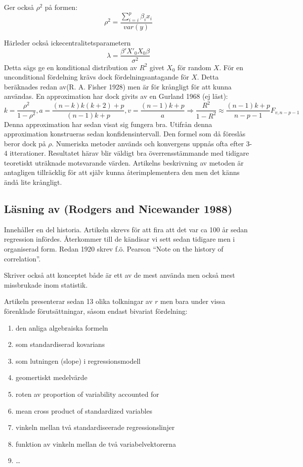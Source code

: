 \documentclass[]{article}
\providecommand{\tightlist}{%
  \setlength{\itemsep}{0pt}\setlength{\parskip}{0pt}}
\begin{document}
Ger också \(\rho^2\) på formen:
\[\rho^2 = \frac{\sum_{i = i}^p \beta_ix_i}{var(y)}\]

Härleder också ickecentralitetsparametern
\[\lambda = \frac{\beta'X'_0X_0\beta}{\sigma^2}\] Detta sägs ge en
konditional distribution av \(R^2\) givet \(X_0\) för random \(X\). För
en unconditional fördelning krävs dock fördelningsantagande för \(X\).
Detta beräknades redan av(R. A. Fisher 1928) men är för krångligt för
att kunna användas. En approximation har dock givits av en Gurland 1968
(ej läst):
\[k = \frac{\rho^2}{1-\rho^2}, a = \frac{(n-k)k(k+2) + p}{(n-1)k +p}, v = \frac{(n-1)k+p}{a}\Rightarrow \frac{R^2}{1-R^2} \approx \frac{(n-1)k +p}{n-p-1}F_{v, n-p-1}\]
Denna approximation har sedan visat sig fungera bra. Utifrån denna
approximation konstrueras sedan konfidensintervall. Den formel som då
föreslås beror dock på \(\rho\). Numeriska metoder används och
konvergens uppnås ofta efter 3-4 itterationer. Resultatet härav blir
väldigt bra överrensstämmande med tidigare teoretiskt uträknade
motsvarande värden. Artikelns beskrivning av metoden är antagligen
tillräcklig för att själv kunna återimplementera den men det känns ändå
lite krångligt.

\subsection{Läsning av (Rodgers and Nicewander
1988)}\label{lasning-av-rodgers1988}

Innehåller en del historia. Artikeln skrevs för att fira att det var ca
100 år sedan regression infördes. Återkommer till de kändisar vi sett
sedan tidigare men i organiserad form. Redan 1920 skrev f.ö. Pearson
``Note on the history of correlation''.

Skriver också att konceptet både är ett av de mest använda men också
mest missbrukade inom statistik.

Artikeln presenterar sedan 13 olika tolkningar av \(r\) men bara under
vissa förenklade förutsättningar, såsom endast bivariat fördelning:

\begin{enumerate}
\def\labelenumi{\arabic{enumi}.}
\tightlist
\item
  den anliga algebraiska formeln
\item
  som standardiserad kovarians
\item
  som lutningen (slope) i regressionsmodell
\item
  geomertiskt medelvärde
\item
  roten av proportion of variability accounted for
\item
  mean cross product of standardized variables
\item
  vinkeln mellan två standardiseerade regressionslinjer
\item
  funktion av vinkeln mellan de två variabelvektorerna
\item
  \ldots{}
\end{enumerate}
\end{document}
